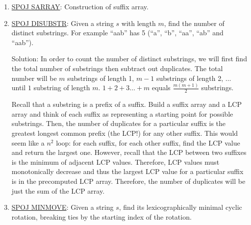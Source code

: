 \documentclass[11pt, oneside]{article}
\begin{document}
\begin{enumerate}
  \item \href{https://www.spoj.com/problems/SARRAY/}{SPOJ SARRAY}:
  Construction of suffix array.

  \item \href{https://www.spoj.com/problems/DISUBSTR/}{SPOJ DISUBSTR}:
  Given a string \( s \) with length \( m \), find the number of distinct substrings.
  For example ``aab'' has 5 (``a'', ``b'', ``aa'', ``ab'' and ``aab'').

  Solution: In order to count the number of distinct substrings,
  we will first find the total number of substrings then subtract out duplicates.
  The total number will be \( m \) substrings of length 1, \( m - 1 \) substrings of length 2,
  \( \dots \) until \( 1 \) substring of length \( m \). \( 1 + 2 + 3 \dots + m \) equals
  \( \frac{m(m + 1)}{2} \) substrings.

  Recall that a substring is a prefix of a suffix. Build a suffix array
  and a LCP array and think of each suffix as representing a starting point for
  possible substrings. Then, the number of duplicates for a particular suffix is the greatest
  longest common prefix (the LCP!) for any other suffix. This would seem like a \( n^2 \) loop:
  for each suffix, for each other suffix, find the LCP value and return the largest one.
  However, recall that the LCP between two suffixes is the minimum of adjacent LCP values.
  Therefore, LCP values must monotonically decrease and thus the largest LCP value for a particular suffix is in the
  precomputed LCP array. Therefore, the number of duplicates will be just the sum of the LCP array.

  \item \href{https://www.spoj.com/problems/MINMOVE/}{SPOJ MINMOVE}:
  Given a string \( s \), find its lexicographically minimal cyclic \\ rotation,
  breaking ties by the starting index of the rotation.


\end{enumerate}
\end{document}
